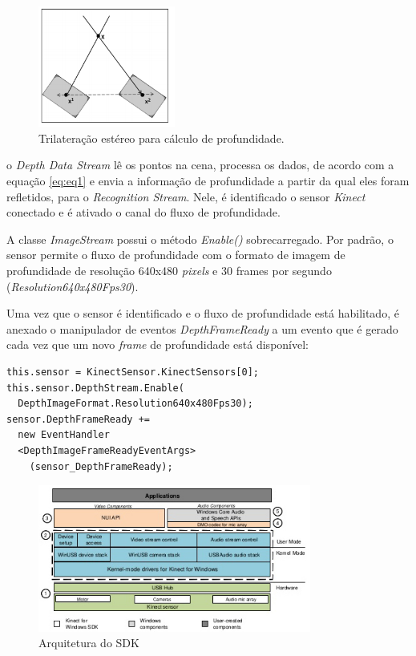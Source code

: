 \begin{figure}[!ht]
\centering
\includegraphics[width=0.4\textwidth]{images/trilateracao_estereo.png}
\caption{Trilateração estéreo para cálculo de profundidade.}
\label{fig:trilatStereo}
\end{figure}

o \textit{Depth Data Stream} lê os pontos na cena, processa os dados, de acordo com a equação \ref{eq:eq1} e envia a informação de profundidade a partir da qual eles foram refletidos, para o \textit{Recognition Stream}. Nele, é identificado o sensor \textit{Kinect} conectado e é ativado o canal do fluxo de profundidade.

A classe \textit{ImageStream} possui o método \textit{Enable()} sobrecarregado. Por padrão, o sensor permite o fluxo de profundidade com o formato de imagem de profundidade de resolução 640x480 \textit{pixels} e 30 frames por segundo (\textit{Resolution640x480Fps30}).

Uma vez que o sensor é identificado e o fluxo de profundidade está habilitado, é anexado o manipulador de eventos \textit{DepthFrameReady} a um evento que é gerado cada vez que um novo \textit{frame} de profundidade está disponível:

\begin{verbatim}
this.sensor = KinectSensor.KinectSensors[0];
this.sensor.DepthStream.Enable(
  DepthImageFormat.Resolution640x480Fps30);
sensor.DepthFrameReady +=
  new EventHandler
  <DepthImageFrameReadyEventArgs>
    (sensor_DepthFrameReady);
\end{verbatim}


\begin{figure}[ht]
\centering
\includegraphics[width=0.8\textwidth]{images/sdk_architecture_color.png}
\caption{Arquitetura do SDK}
\label{fig:sdk_architecture_color}
\end{figure}

